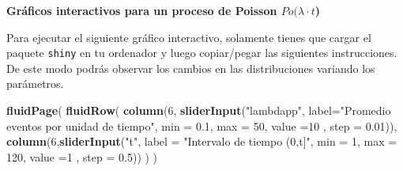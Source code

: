 \documentclass[]{book}
\newenvironment{Shaded}{\begin{snugshade}}{\end{snugshade}}
\newcommand{\DataTypeTok}[1]{\textcolor[rgb]{0.13,0.29,0.53}{#1}}
\newcommand{\DecValTok}[1]{\textcolor[rgb]{0.00,0.00,0.81}{#1}}
\newcommand{\FloatTok}[1]{\textcolor[rgb]{0.00,0.00,0.81}{#1}}
\newcommand{\KeywordTok}[1]{\textcolor[rgb]{0.13,0.29,0.53}{\textbf{#1}}}
\newcommand{\NormalTok}[1]{#1}
\newcommand{\StringTok}[1]{\textcolor[rgb]{0.31,0.60,0.02}{#1}}
\begin{document}
\textbf{Gráficos interactivos para un proceso de Poisson \(Po(\lambda\cdot t\))}

Para ejecutar el siguiente gráfico interactivo, solamente tienes que cargar el paquete \texttt{shiny} en tu ordenador y luego copiar/pegar las siguientes instrucciones. De este modo podrás observar los cambios en las distribuciones variando los parámetros.

\begin{Shaded}
\begin{Highlighting}[]
\KeywordTok{fluidPage}\NormalTok{(}
  \KeywordTok{fluidRow}\NormalTok{(}
      \KeywordTok{column}\NormalTok{(}\DecValTok{6}\NormalTok{,}
           \KeywordTok{sliderInput}\NormalTok{(}\StringTok{"lambdapp"}\NormalTok{, }\DataTypeTok{label=}\StringTok{"Promedio eventos por unidad de tiempo"}\NormalTok{, }
                       \DataTypeTok{min =} \FloatTok{0.1}\NormalTok{, }\DataTypeTok{max =} \DecValTok{50}\NormalTok{, }\DataTypeTok{value =}\DecValTok{10}\NormalTok{ , }\DataTypeTok{step =} \FloatTok{0.01}\NormalTok{)),}
    \KeywordTok{column}\NormalTok{(}\DecValTok{6}\NormalTok{,}\KeywordTok{sliderInput}\NormalTok{(}\StringTok{"t"}\NormalTok{, }\DataTypeTok{label =} \StringTok{"Intervalo de tiempo (0,t]"}\NormalTok{, }
                         \DataTypeTok{min =} \DecValTok{1}\NormalTok{, }\DataTypeTok{max =} \DecValTok{120}\NormalTok{, }\DataTypeTok{value =}\DecValTok{1}\NormalTok{ , }\DataTypeTok{step =} \FloatTok{0.5}\NormalTok{))}
\NormalTok{   )}
\NormalTok{)}



\end{Highlighting}
\end{Shaded}
\end{document}
